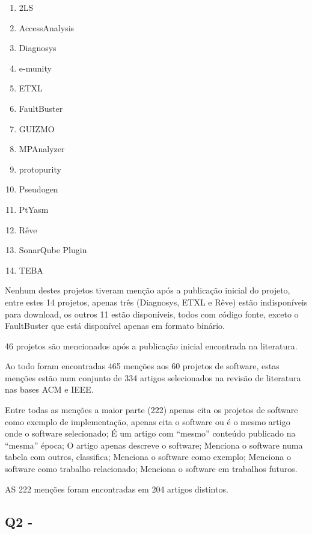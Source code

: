 \begin{enumerate}
  \item 2LS
  \item AccessAnalysis
  \item Diagnosys
  \item e-munity
  \item ETXL
  \item FaultBuster
  \item GUIZMO
  \item MPAnalyzer
  \item protopurity
  \item Pseudogen
  \item PtYasm
  \item Rêve
  \item SonarQube Plugin
  \item TEBA
\end{enumerate}

Nenhum destes projetos tiveram menção após a publicação inicial do projeto,
entre estes 14 projetos, apenas três (Diagnosys, ETXL e Rêve) estão
indisponíveis para download, os outros 11 estão disponíveis, todos com código
fonte, exceto o FaultBuster que está disponível apenas em formato binário.

46 projetos são mencionados após a publicação inicial encontrada na literatura.

Ao todo foram encontradas 465 menções aos 60 projetos de software, estas
menções estão num conjunto de 334 artigos selecionados na revisão de literatura
nas bases ACM e IEEE.



Entre todas as menções a maior parte (222) apenas cita os projetos de software
como exemplo de implementação, apenas cita o software ou é o mesmo artigo onde
o software selecionado; É um artigo com “mesmo” conteúdo publicado na “mesma”
época; O artigo apenas descreve o software; Menciona o software numa tabela com
outros, classifica; Menciona o software como exemplo; Menciona o software como
trabalho relacionado; Menciona o software em trabalhos futuros.


AS 222 menções foram encontradas em 204 artigos distintos.

\subsection{Q2 - \EstudoDoisQuestaoDois}

